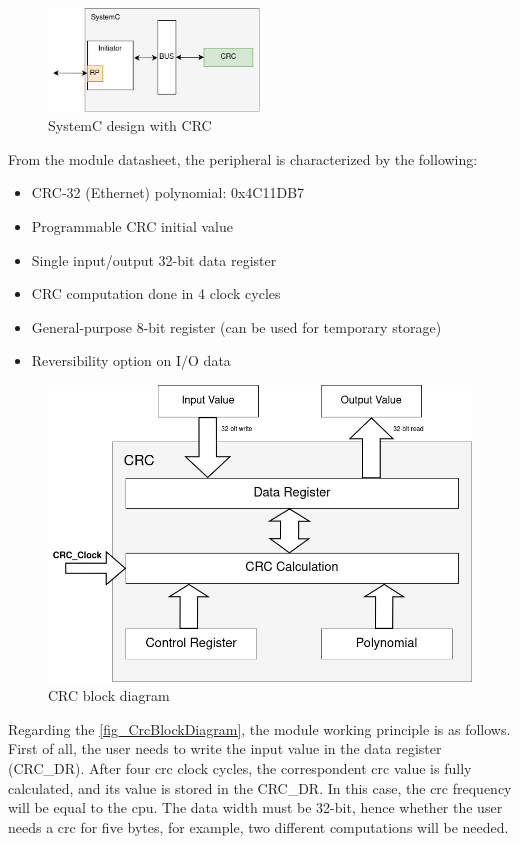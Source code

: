 \begin{figure}[H]
	\centering
	\includegraphics[width=0.5\textwidth]{Images/SystemCdesign_CRC.png}
	\caption{SystemC design with CRC}
	\label{fig_SystemCdesign_CRC}
\end{figure}

From the module datasheet, the peripheral is characterized by the following:  

\begin{itemize}
	\item CRC-32 (Ethernet) polynomial: 0x4C11DB7
	\item Programmable CRC initial value
	\item Single input/output 32-bit data register
	\item CRC computation done in 4 clock cycles 
	\item General-purpose 8-bit register (can be used for temporary storage)
	\item Reversibility option on I/O data
\end{itemize}

\begin{figure}[]
	\centering
 	\includegraphics[width=0.65\linewidth]{Images/CrcBlockDiagram.png}
 	\caption{CRC block diagram}
	 \label{fig_CrcBlockDiagram}
\end{figure}


Regarding the \autoref{fig_CrcBlockDiagram}, the module working principle is as follows. First of all, the user needs to write the input value 
in the data register (CRC\_DR). After four \gls{crc} clock cycles, the correspondent \gls{crc} value is fully calculated, and its
value is stored in the CRC\_DR. In this case, the \gls{crc} frequency will be equal to the \gls{cpu}. The data width must be 32-bit, 
hence whether the user needs a \gls{crc} for five bytes, for example, two different computations will be needed. 

